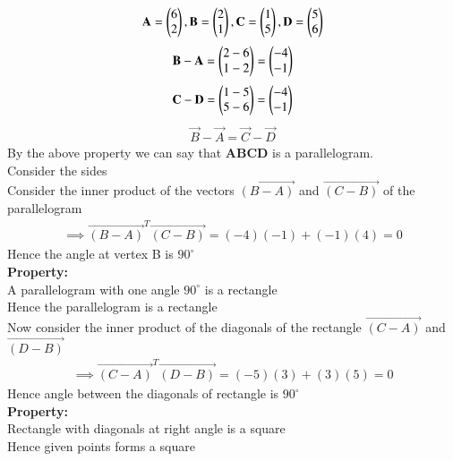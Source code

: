 \documentclass[journal,12pt,onecolumn]{IEEEtran}
\begin{document}
		\begin{align}
			\mathbf{A} = \begin{pmatrix}6\\2\end{pmatrix} ,\mathbf{B}=\begin{pmatrix}2\\1\end{pmatrix} ,\mathbf{C}=\begin{pmatrix}1\\5\end{pmatrix} , \mathbf{D}=\begin{pmatrix}5\\6\end{pmatrix}
		\end{align}
		\begin{align}
		    \mathbf{B}-\mathbf{A}=\begin{pmatrix}2-6\\1-2\end{pmatrix}=\begin{pmatrix}-4\\-1\end{pmatrix}
		\end{align}
        \begin{align}
            \mathbf{C}-\mathbf{D}=\begin{pmatrix}1-5\\5-6\end{pmatrix}=\begin{pmatrix}-4\\-1\end{pmatrix}
        \end{align}
        \begin{align}
            \vec{B}-\vec{A}=\vec{C}-\vec{D}
        \end{align}
        By the above property we can say that \textbf{ABCD} is a parallelogram.\\
        Consider the sides\\
      Consider the inner product of the vectors $\vec{(B-A)}$ and $\vec{(C-B)}$ of the parallelogram\\
      \begin{align}
          \implies \vec{(B-A)}^T \vec{(C-B)}=(-4)(-1)+(-1)(4)=0
      \end{align}
          Hence the angle at vertex B is $90^\circ$\\
      \textbf{Property:}\\
      A parallelogram with one angle $90^\circ$ is a rectangle\\
      Hence the parallelogram is a rectangle\\
      Now consider the inner product of the diagonals of the rectangle $\vec{(C-A)}$ and $\vec{(D-B)}$\\ 
      \begin{align}
         \implies \vec{(C-A)}^T \vec{(D-B)}=(-5)(3)+(3)(5)=0
      \end{align}
      Hence angle between the diagonals of rectangle is $90^\circ$\\
      \textbf{Property:}\\
      Rectangle with diagonals at right angle is a square\\
      Hence given points forms a square\\
\end{document}

